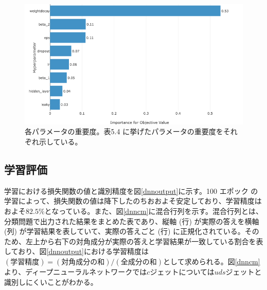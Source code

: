 \begin{figure}[H]
	\begin{center}
 \includegraphics[keepaspectratio, scale=0.3]
 	{Figure/Flavortagging/bays3.png}
 		\caption{各パラメータの重要度。表5.4 に挙げたパラメータの重要度をそれぞれ示している。}
 		\label{dnnbayes3}
	\end{center}
\end{figure}


\subsection{学習評価}
学習における損失関数の値と識別精度を図\ref{dnnoutput}に示す。100 エポック の学習によって、損失関数の値は降下したのちおおよそ安定しており、学習精度はおよそ$82.5\%$となっている。また、図\ref{dnncm}に混合行列を示す。混合行列とは、分類問題で出力された結果をまとめた表であり、縦軸 (行) が実際の答えを横軸 (列) が学習結果を表していて、実際の答えごと (行) に正規化されている。そのため、左上から右下の対角成分が実際の答えと学習結果が一致している割合を表しており、図\ref{dnnoutput}における学習精度は$(学習精度) = (対角成分の和) / (全成分の和)$として求められる。図\ref{dnncm}より、ディープニューラルネットワークでは$c$ジェットについては$uds$ジェットと識別しにくいことがわかる。

